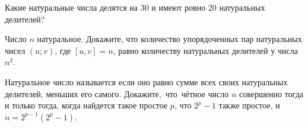 \documentclass[12pt,a4paper]{article}
\begin{document}
Какие натуральные числа делятся на 30 и имеют ровно
20 натуральных делителей?



 Число $n$ натуральное. %
Докажите, что количество упорядоченных пар натуральных
чисел $(u;v)$, где $[u,v]=n$, равно количеству
натуральных делителей у числа $n^2$.


 Натуральное число называется 
если оно равно сумме всех своих натуральных делителей, меньших его самого.
Докажите,~что~ч\"етное число $n$ совершенно
тогда и только тогда, когда  найдется такое простое $p$,
что $2^p-1$ также простое, и $n=2^{p-1}(2^p-1)$.














\end{document}

